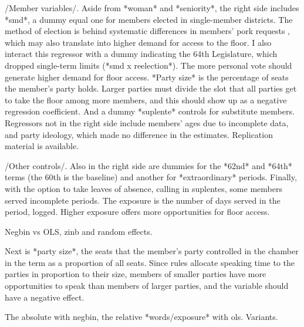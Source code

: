 /Member variables/. Aside from *woman* and *seniority*, the right side includes *smd*, a dummy equal one for members elected in single-member districts.
The method of election is behind systematic differences in members' pork requests \citep{kerevelPork2015}, which may also translate into higher demand for access to the floor. I also interact this regressor with a dummy indicating the 64th Legislature, which dropped single-term limits (*smd x reelection*). The more personal vote should generate higher demand for floor access. *Party size* is the percentage of seats the member's party holds. Larger parties must divide the slot that all parties get to take the floor among more members, and this should show up as a negative regression coefficient. And a dummy *suplente* controls for substitute members. Regressors not in the right side include members' ages due to incomplete data, and party ideology, which made no difference in the estimates. Replication material is available. 

/Other controls/. Also in the right side are dummies for the *62nd* and *64th* terms (the 60th is the baseline) and another for *extraordinary* periods. Finally, with the option to take leaves of absence, calling in suplentes, some members served incomplete periods. The exposure is the number of days served in the period, logged. Higher exposure offers more opportunities for floor access. 

Negbin vs OLS, zinb and random effects. 


Next is *party size*, the seats that the member's party controlled in the chamber in the term as a proportion of all seats. Since rules allocate speaking time to the parties in proportion to their size, members of smaller parties have more opportunities to speak than  members of larger parties, and the variable should have a negative effect.


The absolute with negbin, the relative *words/exposure* with ols. Variants.

